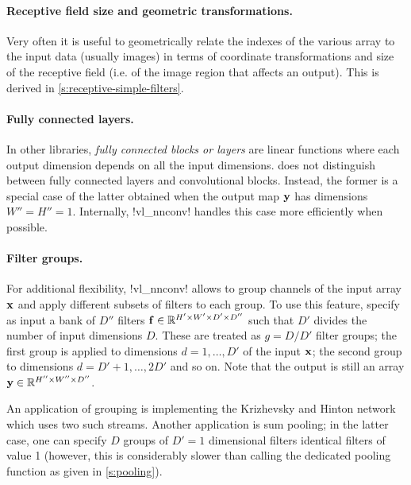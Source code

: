 \paragraph{Receptive field size and geometric transformations.} Very often it is useful to geometrically relate the indexes of the various array to the input data (usually images) in terms of coordinate transformations and size of the receptive field (i.e. of the image region that affects an output). This is derived in \cref{s:receptive-simple-filters}.

\paragraph{Fully connected layers.} In other libraries, \emph{fully connected blocks or layers} are linear functions where each output dimension depends on all the input dimensions. \matconvnet does not distinguish between fully connected layers and convolutional blocks. Instead, the former is a special case of the latter obtained when the output map $\mathbf{y}$ has dimensions $W''=H''=1$. Internally, !vl_nnconv! handles this case more efficiently when possible.

\paragraph{Filter groups.} For additional flexibility, !vl_nnconv! allows to group channels of the input array $\mathbf{x}$ and apply different subsets of filters to each group. To use this feature, specify as input a bank  of $D''$ filters $\mathbf{f}\in\mathbb{R}^{H'\times W'\times D'\times D''}$ such that $D'$ divides the number of input dimensions $D$. These are treated as $g=D/D'$ filter groups; the first group is applied to dimensions $d=1,\dots,D'$ of the input $\mathbf{x}$; the second group to dimensions $d=D'+1,\dots,2D'$ and so on. Note that the output is still an array $\mathbf{y}\in\mathbb{R}^{H''\times W''\times D''}$.

An application of grouping is implementing the Krizhevsky and Hinton network~\cite{krizhevsky12imagenet} which uses two such streams. Another application is sum pooling; in the latter case, one can specify $D$ groups of $D'=1$ dimensional filters identical filters of value 1 (however, this is considerably slower than calling the dedicated pooling function as given in \cref{s:pooling}).

